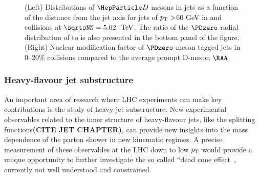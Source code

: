 \begin{figure}
\caption{(Left) Distributions of $\PD$ mesons in jets as a function of the distance from the jet axis for jets of $p\sb{\scriptstyle\mathrm{T}}>$60 GeV in \pp and \PbPb collisions at $\sqrtsNN=5.02~{\UTeV}$. The ratio of the $\PDzero$ radial distribution of \PbPb to \pp is also presented in the bottom panel of the figure. (Right) Nuclear modification factor of $\PDzero$-meson tagged jets in 0--20$\%$ \PbPb collisions compared to the average prompt D-meson $\RAA$.}
\label{fig:DjetCMS}
\end {figure}

\subsubsection{Heavy-flavour jet substructure}
An important area of research where LHC experiments can make key contributions is the study of heavy jet substructure. New experimental observables related to the inner structure of heavy-flavour jets, like the splitting functions\textbf{(CITE JET CHAPTER)}, can provide new insights into the mass dependence of the parton shower in new kinematic regimes. A precise measurement of these observables at the LHC down to low $p\sb{\scriptstyle\mathrm{T}}$ would provide a unique opportunity to further investigate the so called ``dead cone effect~\cite{DOKSHITZER2001199}, currently not well understood and constrained.

